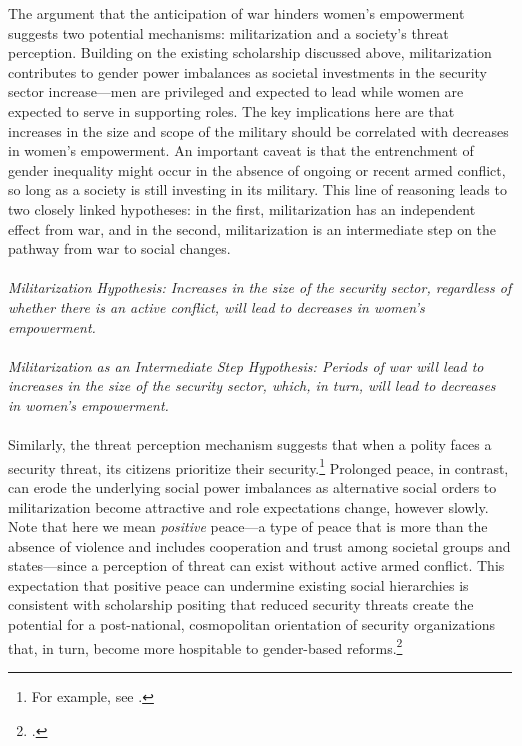 \documentclass [12pt] {article}
\begin{document}
The argument that the anticipation of war hinders women's empowerment suggests two potential mechanisms: militarization and a society's threat perception.  Building on the existing scholarship discussed above, militarization contributes to gender power imbalances as societal investments in the security sector increase---men are privileged and expected to lead while women are expected to serve in supporting roles.  The key implications here are that increases in the size and scope of the military should be correlated with decreases in women's empowerment. An important caveat is that the entrenchment of gender inequality might occur in the absence of ongoing or recent armed conflict, so long as a society is still investing in its military. This line of reasoning leads to two closely linked hypotheses: in the first, militarization has an independent effect from war, and in the second, militarization is an intermediate step on the pathway from war to social changes.\\ \\

\emph{Militarization Hypothesis: Increases in the size of the security sector, regardless of whether there is an active conflict, will lead to decreases in women's empowerment.} \\ \\

\emph{Militarization as an Intermediate Step Hypothesis: Periods of war will lead to increases in the size of the security sector, which, in turn, will lead to decreases in women's empowerment.} \\ \\

Similarly, the threat perception mechanism suggests that when a polity faces a security threat, its citizens prioritize their security.\footnote{For example, see .} Prolonged peace, in contrast, can erode the underlying social power imbalances as alternative social orders to militarization become attractive and role expectations change, however slowly. Note that here we mean \textit{positive} peace---a type of peace that is more than the absence of violence and includes cooperation and trust among societal groups and states---since a perception of threat can exist without active armed conflict. This expectation that positive peace can undermine existing social hierarchies is consistent with scholarship positing that reduced security threats create the potential for a post-national, cosmopolitan orientation of security organizations that, in turn, become more hospitable to gender-based reforms.\footnote{.}\\
\end{document}
